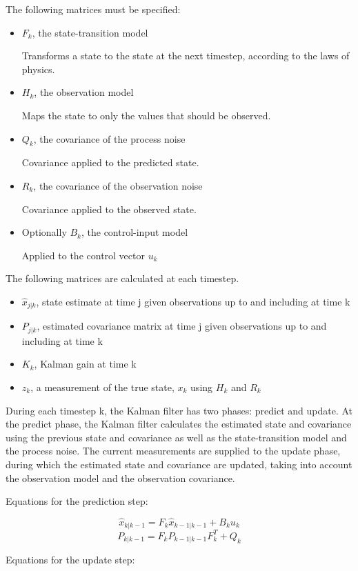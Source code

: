 The following matrices must be specified:
\begin{itemize}
    \item $F_k$, the state-transition model
    
    Transforms a state to the state at the next timestep, according to the laws of physics.
    \item $H_k$, the observation model
    
    Maps the state to only the values that should be observed.
    \item $Q_k$, the covariance of the process noise
    
    Covariance applied to the predicted state.
    \item $R_k$, the covariance of the observation noise
    
    Covariance applied to the observed state.
    \item Optionally $B_k$, the control-input model
    
    Applied to the control vector $u_k$
\end{itemize}

The following matrices are calculated at each timestep.
\begin{itemize}
    \item $\hat{x}_{j|k}$, state estimate at time j given observations up to and including at time k
    \item $P_{j|k}$, estimated covariance matrix at time j given observations up to and including at time k
    \item $K_k$, Kalman gain at time k
    \item $z_k$, a measurement of the true state, $x_k$ using $H_k$ and $R_k$
\end{itemize}


During each timestep k, the Kalman filter has two phases: predict and update. At the predict phase, the Kalman filter calculates the estimated state and covariance using the previous state and covariance as well as the state-transition model and the process noise. The current measurements are supplied to the update phase, during which the estimated state and covariance are updated, taking into account the observation model and the observation covariance.

Equations for the prediction step:

\[ \hat{x}_{k|k-1} = F_k \hat{x}_{k-1|k-1} + B_k u_k  \] 
\[ P_{k|k-1} = F_k P_{k-1|k-1} F^T_k + Q_k \]

Equations for the update step:


